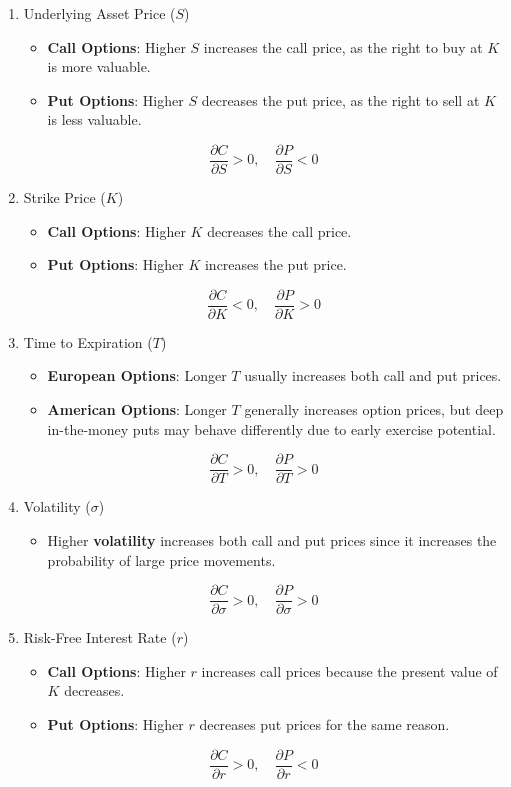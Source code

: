 \documentclass[letterpaper]{article}
\begin{document}
		\begin{enumerate}
		\item Underlying Asset Price ($S$)
		\begin{itemize}
			\item \textbf{Call Options}: Higher $S$ {increases} the call price, as the right to buy at $K$ is more valuable.
			\item \textbf{Put Options}: Higher $S$ {decreases} the put price, as the right to sell at $K$ is less valuable.
		\end{itemize}
		$$
			\frac{\partial C}{\partial S} > 0, \quad \frac{\partial P}{\partial S} < 0
		$$
		
		\item Strike Price ($K$)
		\begin{itemize}
			\item \textbf{Call Options}: Higher $K$ {decreases} the call price.
			\item \textbf{Put Options}: Higher $K$ {increases} the put price.
		\end{itemize}
		$$
			\frac{\partial C}{\partial K} < 0, \quad \frac{\partial P}{\partial K} > 0
		$$
		
		\item Time to Expiration ($T$)
		\begin{itemize}
			\item \textbf{European Options}: Longer $T$ {usually increases} both call and put prices.
			\item \textbf{American Options}: Longer $T$ generally increases option prices, but deep in-the-money puts may behave differently due to early exercise potential.
		\end{itemize}
		$$
			\frac{\partial C}{\partial T} > 0, \quad \frac{\partial P}{\partial T} > 0
		$$
		
	    \item Volatility ($\sigma$)
		\begin{itemize}
			\item Higher \textbf{volatility} {increases} both call and put prices since it increases the probability of large price movements.
		\end{itemize}
		$$
			\frac{\partial C}{\partial \sigma} > 0, \quad \frac{\partial P}{\partial \sigma} > 0
		$$
		
		\item Risk-Free Interest Rate ($r$)
		\begin{itemize}
			\item \textbf{Call Options}: Higher $r$ {increases} call prices because the present value of $K$ decreases.
			\item \textbf{Put Options}: Higher $r$ {decreases} put prices for the same reason.
		\end{itemize}
	    $$
			\frac{\partial C}{\partial r} > 0, \quad \frac{\partial P}{\partial r} < 0
		$$
		

\end{enumerate}
\end{document}
